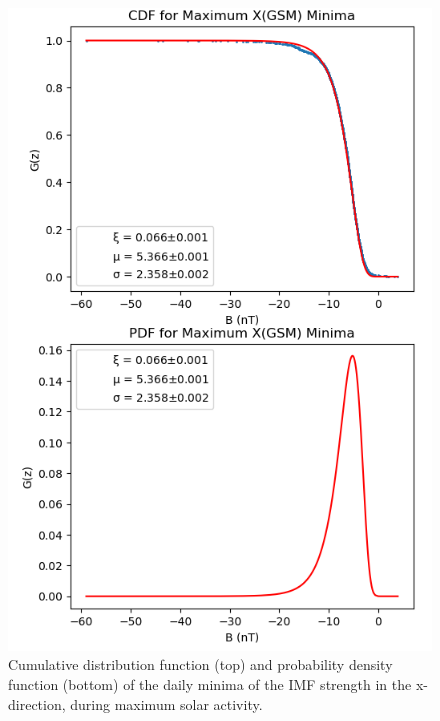 \documentclass[11pt]{article}
\begin{document}
\begin{figure}[t!]
            \begin{minipage}{0.48\textwidth}
                \centering
                \includegraphics[width=\textwidth]{fig_method/MFImaxXmin.png}
                \caption{Cumulative distribution function (top) and probability density function (bottom) of the daily minima of the IMF strength in the x-direction, during maximum solar activity.}
                \label{fig:MFImaxXmin}
            \end{minipage}
        \end{figure}
\end{document}
